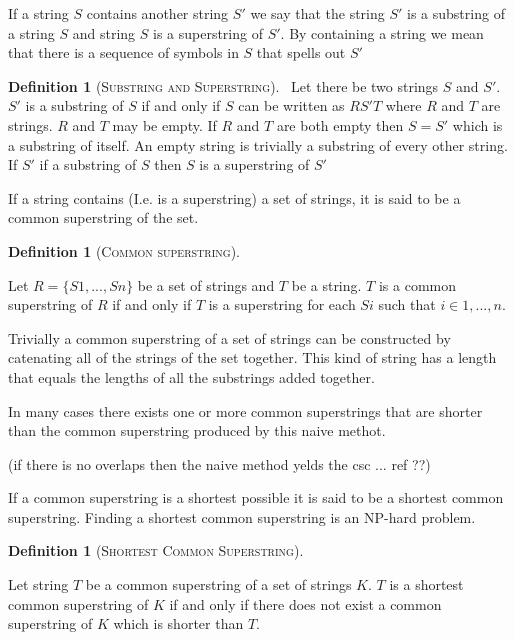 \documentclass[english,twoside,censored,csm,algorithms-track-2020]{HYthesisML}
\theoremstyle{plain}
\theoremstyle{definition}
\newtheorem{definition}[equation]{Definition}
\begin{document}
If a string $S$ contains another string $S'$ we say that the string $S'$ is a substring of a string $S$ and string $S$ is a superstring of $S'$.
By containing a string we mean that there is a sequence of symbols in $S$ that spells out $S'$

\begin{definition}[\textsc{Substring and Superstring}]~\label{def-sub-super}
  Let there be two strings $S$ and $S'$.
  $S'$ is a substring of $S$ if and only if $S$ can be written as $RS'T$ where $R$ and $T$ are strings. $R$ and $T$ may be empty.
  If $R$ and $T$ are both empty then $S = S'$ which is a substring of itself.
  An empty string is trivially a substring of every other string.\\

  If $S'$ if a substring of $S$ then $S$ is a superstring of $S'$
\end{definition}

If a string contains (I.e. is a superstring) a set of strings, it is said to be a common superstring of the set.

\begin{definition}[\textsc{Common superstring}]~\label{def-cs}

  Let $R = \{S1,...,Sn\}$ be a set of strings and $T$ be a string.
  $T$ is a common superstring of $R$ if and only if $T$ is a superstring for each $Si$ such that $i\in 1,...,n$.
  
\end{definition}

Trivially a common superstring of a set of strings can be constructed by catenating all of the strings of the set together.
This kind of string has a length that equals the lengths of all the substrings added together.

In many cases there exists one or more common superstrings that are shorter than the common superstring produced by this naive methot.

(if there is no overlaps then the naive method yelds the csc ... ref ??)

If a common superstring is a shortest possible it is said to be a shortest common superstring. Finding a shortest common superstring is
an \textsc{NP}-hard problem. 

\begin{definition}[\textsc{Shortest Common Superstring}]~\label{def-scs}

  Let string $T$ be a common superstring of a set of strings $K$.
  $T$ is a shortest common superstring of $K$ if and only if there does not exist a common superstring of $K$ which is shorter than $T$.
  
\end{definition}
\end{document}
